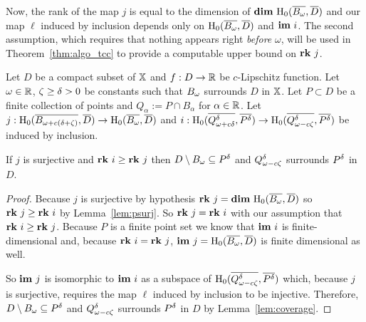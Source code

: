 Now, the rank of the map $j$ is equal to the dimension of $\mathbf{dim}~\mathrm{H}_0(\overline{B_\omega}, \overline{D})$ and our map $\ell$ induced by inclusion depends only on $\mathrm{H}_0(\overline{B_\omega}, \overline{D})$ and $\mathbf{im}~i$.
The second assumption, which requires that nothing appears right \emph{before} $\omega$, will be used in Theorem~\ref{thm:algo_tcc} to provide a computable upper bound on $\mathbf{rk}~j$.

\begin{theorem}\label{thm:geo_tcc}
  Let $D$ be a compact subset of $\mathbb{X}$ and $f : D\to\mathbb{R}$ be $c$-Lipschitz function.
  Let $\omega\in\mathbb{R}$, $\zeta\geq{\delta} > 0$ be constants such that $B_{\omega}$ surrounds $D$ in $\mathbb{X}$.
  Let $P\subset D$ be a finite collection of points and $Q_\alpha := P\cap B_\alpha$ for $\alpha\in\mathbb{R}$.
  Let $j : \mathrm{H}_0(\overline{B_{\omega+c(\delta+\zeta)}},\overline{D})\to \mathrm{H}_0(\overline{B_{\omega}},\overline{D})$ and $i : \mathrm{H}_0(\overline{Q_{\omega + c{\delta}}^{\delta}}, \overline{P^{\delta}})\to \mathrm{H}_0(\overline{Q_{\omega - c\zeta}^{\delta}}, \overline{P^{\delta}})$ be induced by inclusion.

  If $j$ is surjective and $\mathbf{rk}~i\geq \mathbf{rk}~j$ then $D\setminus B_{\omega}\subseteq P^{\delta}$ and $Q_{\omega - c\zeta}^{\delta}$ surrounds $P^{\delta}$ in $D$.
\end{theorem}
\begin{proof}
  Because $j$ is surjective by hypothesis $\mathbf{rk}~j = \mathbf{dim}~\mathrm{H}_0(\overline{B_{\omega}},\overline{D})$ so $\mathbf{rk}~j\geq \mathbf{rk}~i$ by Lemma~\ref{lem:psurj}.
  So $\mathbf{rk}~j = \mathbf{rk}~i$ with our assumption that $\mathbf{rk}~i\geq \mathbf{rk}~j$.
  Because $P$ is a finite point set we know that $\mathbf{im}~i$ is finite-dimensional and, because $\mathbf{rk}~i = \mathbf{rk}~j$, $\mathbf{im}~j=\mathrm{H}_0(\overline{B_{\omega}}, \overline{D})$ is finite dimensional as well.

  So $\mathbf{im}~j$ is isomorphic to $\mathbf{im}~i$ as a subspace of $\mathrm{H}_0(\overline{Q_{\omega - c\zeta}^{\delta}}, \overline{P^{\delta}})$ which, because $j$ is surjective, requires the map $\ell$ induced by inclusion to be injective.
  Therefore, $D\setminus B_\omega\subseteq P^{\delta}$ and $Q_{\omega - c\zeta}^{\delta}$ surrounds $P^{\delta}$ in $D$ by Lemma~\ref{lem:coverage}. %
\end{proof}

